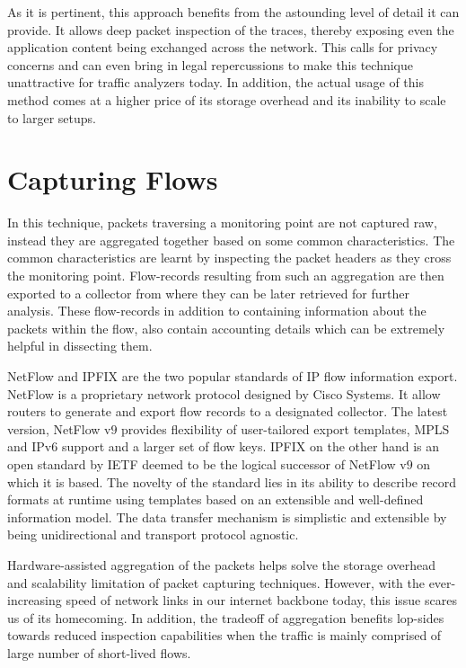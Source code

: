 As it is pertinent, this approach benefits from the astounding level of detail it can provide. It allows deep packet inspection of the traces, thereby exposing even the application content being exchanged  across the network. This calls for privacy concerns and can even bring in legal repercussions to make this technique unattractive for traffic analyzers today. In addition, the actual usage of this method comes at a higher price of its storage overhead and its inability to scale to larger setups.

\section{Capturing Flows}\label{sec:capturing-flows}
In this technique, packets traversing a monitoring point are not captured raw, instead they are aggregated together based on some common characteristics. The common characteristics are learnt by inspecting the packet headers as they cross the monitoring point. Flow-records resulting from such an aggregation are then exported to a collector from where they can be later retrieved for further analysis. These flow-records in addition to containing information about the packets within the flow, also contain accounting details which can be extremely helpful in dissecting them. 

NetFlow and \ac{IPFIX} are the two popular standards of \ac{IP} flow information export. NetFlow \cite{rfc3954} is a proprietary network protocol designed by Cisco Systems. It  allow routers to generate and export flow records to a designated collector. The latest version, NetFlow v$9$ provides flexibility of user-tailored export templates, \ac{MPLS} and \ac{IP}v$6$ support and a larger set of flow keys. \ac{IPFIX} \cite{rfc5101} on the other hand is an open standard by \ac{IETF} deemed to be the logical successor of NetFlow v$9$ on which it is based. The novelty of  the standard lies in its ability to describe record formats at runtime using templates based on an extensible and well-defined information model. The data transfer mechanism is simplistic and extensible by being unidirectional and transport protocol agnostic.  




Hardware-assisted aggregation of the packets helps solve the storage overhead and scalability limitation of packet capturing techniques. However, with the ever-increasing  speed of network links in our internet backbone today, this issue scares us of its homecoming. In addition, the tradeoff of aggregation benefits lop-sides towards reduced inspection capabilities when the traffic is mainly comprised of large number of short-lived flows. 

